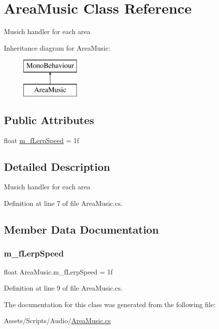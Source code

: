 \hypertarget{class_area_music}{}\section{Area\+Music Class Reference}
\label{class_area_music}


Musich handler for each area  


Inheritance diagram for Area\+Music\+:\begin{figure}[H]
\begin{center}
\leavevmode
\includegraphics[height=2.000000cm]{class_area_music}
\end{center}
\end{figure}
\subsection*{Public Attributes}
\begin{DoxyCompactItemize}
\item 
float \mbox{\hyperlink{class_area_music_abe470ab7fd42e357c692450895c443db}{m\+\_\+f\+Lerp\+Speed}} = 1f
\end{DoxyCompactItemize}


\subsection{Detailed Description}
Musich handler for each area 



Definition at line 7 of file Area\+Music.\+cs.



\subsection{Member Data Documentation}
\mbox{\label{class_area_music_abe470ab7fd42e357c692450895c443db}} 
\subsubsection{\texorpdfstring{m\+\_\+f\+Lerp\+Speed}{m\_fLerpSpeed}}
{\footnotesize\ttfamily float Area\+Music.\+m\+\_\+f\+Lerp\+Speed = 1f}



Definition at line 9 of file Area\+Music.\+cs.



The documentation for this class was generated from the following file\+:\begin{DoxyCompactItemize}
\item 
Assets/\+Scripts/\+Audio/\mbox{\hyperlink{_area_music_8cs}{Area\+Music.\+cs}}\end{DoxyCompactItemize}
